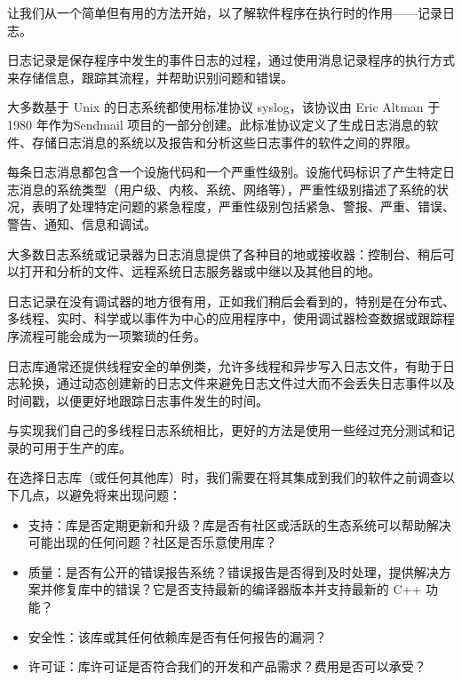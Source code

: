 
让我们从一个简单但有用的方法开始，以了解软件程序在执行时的作用——记录日志。

日志记录是保存程序中发生的事件日志的过程，通过使用消息记录程序的执行方式来存储信息，跟踪其流程，并帮助识别问题和错误。

大多数基于 Unix 的日志系统都使用标准协议 syslog，该协议由 Eric Altman 于 1980 年作为Sendmail 项目的一部分创建。此标准协议定义了生成日志消息的软件、存储日志消息的系统以及报告和分析这些日志事件的软件之间的界限。

每条日志消息都包含一个设施代码和一个严重性级别。设施代码标识了产生特定日志消息的系统类型（用户级、内核、系统、网络等），严重性级别描述了系统的状况，表明了处理特定问题的紧急程度，严重性级别包括紧急、警报、严重、错误、警告、通知、信息和调试。

大多数日志系统或记录器为日志消息提供了各种目的地或接收器：控制台、稍后可以打开和分析的文件、远程系统日志服务器或中继以及其他目的地。

日志记录在没有调试器的地方很有用，正如我们稍后会看到的，特别是在分布式、多线程、实时、科学或以事件为中心的应用程序中，使用调试器检查数据或跟踪程序流程可能会成为一项繁琐的任务。

日志库通常还提供线程安全的单例类，允许多线程和异步写入日志文件，有助于日志轮换，通过动态创建新的日志文件来避免日志文件过大而不会丢失日志事件以及时间戳，以便更好地跟踪日志事件发生的时间。

与实现我们自己的多线程日志系统相比，更好的方法是使用一些经过充分测试和记录的可用于生产的库。


在选择日志库（或任何其他库）时，我们需要在将其集成到我们的软件之前调查以下几点，以避免将来出现问题：

\begin{itemize}
\item
支持：库是否定期更新和升级？库是否有社区或活跃的生态系统可以帮助解决可能出现的任何问题？社区是否乐意使用库？

\item
质量：是否有公开的错误报告系统？错误报告是否得到及时处理，提供解决方案并修复库中的错误？它是否支持最新的编译器版本并支持最新的 C++ 功能？

\item
安全性：该库或其任何依赖库是否有任何报告的漏洞？

\item
许可证：库许可证是否符合我们的开发和产品需求？费用是否可以承受？
\end{itemize}

